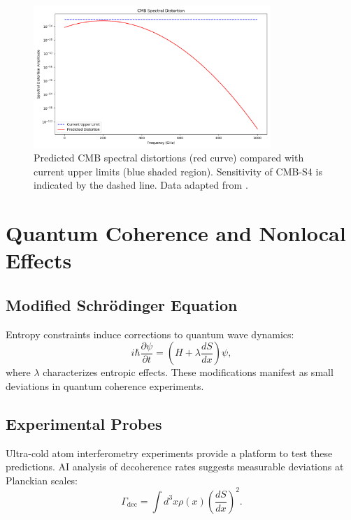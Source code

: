 \documentclass[12pt]{article}
\begin{document}
\begin{figure}[h!]
    \centering
    \includegraphics[width=0.8\textwidth]{cmb_spectral_distortion.png} %
    \caption{Predicted CMB spectral distortions (red curve) compared with current upper limits (blue shaded region). Sensitivity of CMB-S4 is indicated by the dashed line. Data adapted from \cite{CMB-S42023}.}
    \label{fig:cmb_spectral_distortion}
\end{figure}

\section{Quantum Coherence and Nonlocal Effects}
\subsection{Modified Schrödinger Equation}
Entropy constraints induce corrections to quantum wave dynamics:
\begin{equation}
i \hbar \frac{\partial \psi}{\partial t} = \left(H + \lambda \frac{dS}{dx}\right) \psi,
\end{equation}
where $\lambda$ characterizes entropic effects. These modifications manifest as small deviations in quantum coherence experiments.

\subsection{Experimental Probes}
Ultra-cold atom interferometry experiments \cite{Kasevich2023} provide a platform to test these predictions. AI analysis of decoherence rates suggests measurable deviations at Planckian scales:
\begin{equation}
\Gamma_{\text{dec}} = \int d^3x \rho(x) \left(\frac{dS}{dx}\right)^2.
\end{equation}
\end{document}
